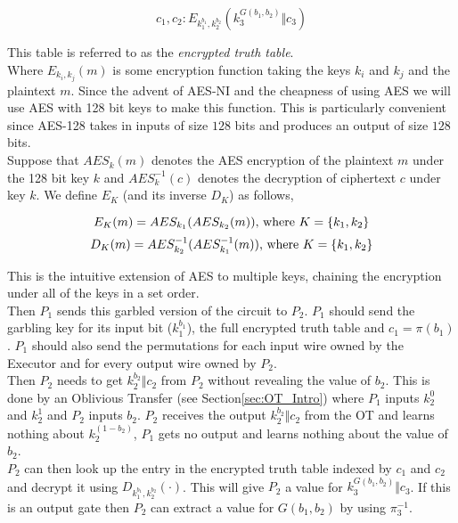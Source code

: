 \documentclass[ %
                    author={Nicholas Tutte},
                supervisor={Prof. Nigel Smart},
                    degree={MEng},
                     title={Secure Two Party Computation},
                  subtitle={A practical comparison of recent protocols},
                      type={Research - GG1K},
                      year={2015} ]{dissertation}
\begin{document}
			$$ c_1, c_2 : E_{k_1^{b_1}, k_2^{b_2}} (k_3^{ G(b_1, b_2) } \Vert c_3) $$

			This table is referred to as the \emph{encrypted truth table}.\\

			Where $E_{k_i, k_j}(m)$ is some encryption function taking the keys $k_i$ and $k_j$ and the plaintext $m$. Since the advent of AES-NI and the cheapness of using AES we will use AES with 128 bit keys to make this function. This is particularly convenient since AES-128 takes in inputs of size $128$ bits and produces an output of size $128$ bits.\\

			Suppose that $AES_k(m)$ denotes the AES encryption of the plaintext $m$ under the 128 bit key $k$ and $AES^{-1}_k(c)$ denotes the decryption of ciphertext $c$ under key $k$. We define $E_K$ (and its inverse $D_K$) as follows,

			$$ E_K(m) = AES_{k_1}( AES_{k_2}(m)) \textnormal{, where } K = \{k_1, k_2\}$$ 
			$$ D_K(m) = AES^{-1}_{k_2}( AES^{-1}_{k_{1}}(m)) \textnormal{, where } K = \{k_1, k_2\}$$ 

			This is the intuitive extension of AES to multiple keys, chaining the encryption under all of the keys in a set order.\\

			Then $P_1$ sends this garbled version of the circuit to $P_2$. $P_1$ should send the garbling key for its input bit ($k_1^{b_1}$), the full encrypted truth table and $c_1 = \pi(b_1)$. $P_1$ should also send the permutations for each input wire owned by the Executor and for every output wire owned by $P_2$.\\

			Then $P_2$ needs to get $k_2^{b_2} \Vert c_2$ from $P_2$ without revealing the value of $b_2$. This is done by an Oblivious Transfer (see Section\ref{sec:OT_Intro}) where $P_1$ inputs $k_2^0$ and $k_2^1$ and $P_2$ inputs $b_2$. $P_2$ receives the output $k_2^{b_2} \Vert c_2$ from the OT and learns nothing about $k_2^{(1 - b_2)} $, $P_1$ gets no output and learns nothing about the value of $b_2$.\\

			$P_2$ can then look up the entry in the encrypted truth table indexed by $c_1$ and $c_2$ and decrypt it using $D_{k_1^{b_1}, k_2^{b_2}}(\cdot)$. This will give $P_2$ a value for $k_3^{G(b_1, b_2)} \Vert c_3$. If this is an output gate then $P_2$ can extract a value for $G(b_1, b_2)$ by using $\pi_3^{-1}$.\\
\end{document}
